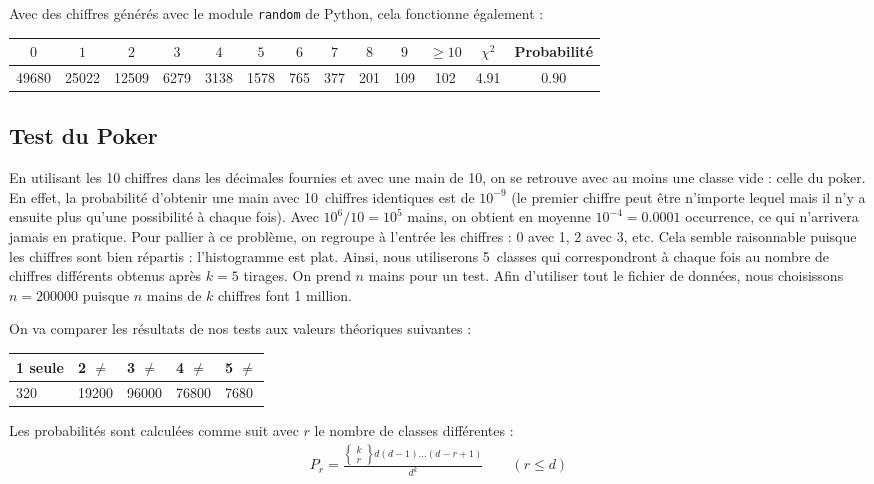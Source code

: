 \documentclass[12pt,a4paper]{article}
\begin{document}
Avec des chiffres générés avec le module \texttt{random} de Python,
cela fonctionne également :
\begin{center}
\begin{tabular}{c|c|c|c|c|c|c|c|c|c|c|c|c}
$0$ & $1$ & $2$ & $3$ & $4$ & $5$ & $6$ & $7$ & $8$ & $9$ & $\geq 10$ &
	$\chi^2$ & Probabilité \\ \hline
49680 & 25022 & 12509 & 6279 & 3138 & 1578 & 765 & 377 & 201 & 109 & 102 &
	4.91 &  0.90
\end{tabular}
\end{center}


\subsection{Test du Poker}
En utilisant les 10 chiffres dans les décimales fournies et avec une main de 10,
on se retrouve avec au moins une classe vide : celle du poker. En effet, la
probabilité d'obtenir une main avec 10~chiffres identiques est de $10^{-9}$
(le premier chiffre peut être n'importe lequel mais il n'y a ensuite plus
qu'une possibilité à chaque fois). Avec $10^6/10=10^5$ mains, on obtient en
moyenne $10^{-4}=0.0001$ occurrence, ce qui n'arrivera jamais en pratique.
Pour pallier à ce problème, on regroupe à l'entrée les chiffres : 0 avec 1,
2 avec 3, etc. Cela semble raisonnable puisque les chiffres sont bien répartis :
l'histogramme est plat. Ainsi, nous utiliserons 5~classes qui correspondront
à chaque fois au nombre de chiffres différents obtenus après $k=5$ tirages.
On prend $n$ mains pour un test. Afin d'utiliser tout le fichier de données,
nous choisissons $n=200000$ puisque $n$ mains de $k$ chiffres font 1 million.

On va comparer les résultats de nos tests aux valeurs théoriques suivantes :
\begin{center}
\begin{tabular}{l|l|l|l|l}
1 seule & 2 $\neq$ & 3 $\neq$ & 4 $\neq$ & 5 $\neq$ \\ \hline
320 & 19200 & 96000 & 76800 & 7680
\end{tabular}
\end{center}

Les probabilités sont calculées comme suit
avec $r$ le nombre de classes différentes :
\begin{align*}
	P_r = \frac {\left\{\begin{array}{l}k\\r\end{array}\right\}
		d(d-1)\dots(d-r+1)}
	{d^k}
	\qquad (r \leq d)
\end{align*}
\end{document}
